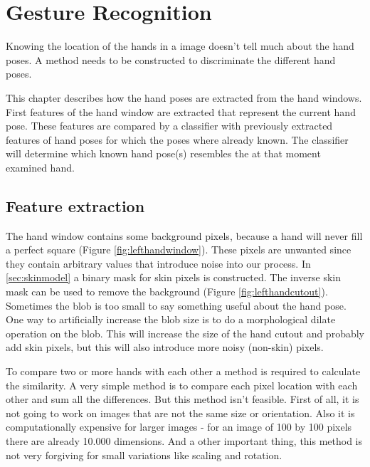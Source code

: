 
\chapter{Gesture Recognition}
\label{ch:gestures}

Knowing the location of the hands in a image doesn't tell much about the hand poses. A method needs to be constructed to discriminate the different hand poses.

This chapter describes how the hand poses are extracted from the hand windows. First features of the hand window are extracted that represent the current hand pose. These features are compared by a classifier with previously extracted features of hand poses for which the poses where already known. The classifier will determine which known hand pose(s) resembles the at that moment examined hand.


\section{Feature extraction}
The hand window contains some background pixels, because a hand will never fill a perfect square (Figure \autoref{fig:lefthandwindow}). These pixels are unwanted since they contain arbitrary values that introduce noise into our process. In \autoref{sec:skinmodel} a binary mask for skin pixels is constructed. The inverse skin mask can be used  to remove the background (Figure \autoref{fig:lefthandcutout}). Sometimes the blob is too small to say something useful about the hand pose. One way to artificially increase the blob size is to do a morphological dilate operation on the blob. This will increase the size of the hand cutout and probably add skin pixels, but this will also introduce more noisy (non-skin) pixels.

To compare two or more hands with each other a method is required to calculate the similarity. A very simple method is to compare each pixel location with each other and sum all the differences. But this method isn't feasible. First of all, it is not going to work on images that are not the same size or orientation. Also it is computationally expensive for larger images - for an image of 100 by 100 pixels there are already 10.000 dimensions. And a other important thing, this method is not very forgiving for small variations like scaling and rotation.


